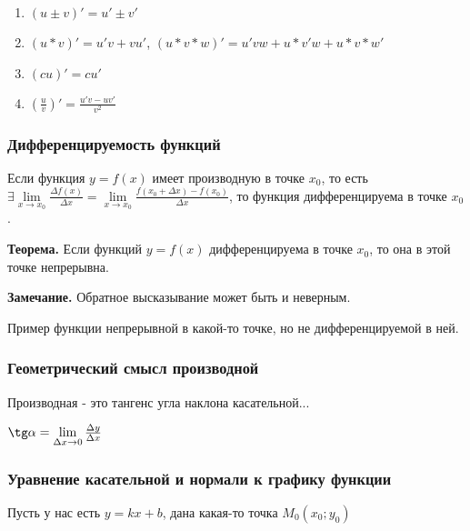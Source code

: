 \documentclass{article}
\begin{document}
\begin{flushleft}
\begin{enumerate}
    \item $(u \pm v)' = u' \pm v'$
    \item $(u * v)' = u' v + v u'$, $(u * v * w)' = u' v w + u * v' w + u * v * w'$
    \item $(cu)' = c u'$
    \item $(\frac{u}{v})' = \frac{u' v - u v'}{v^2}$
\end{enumerate}

\subsubsection{Дифференцируемость функций}

Если функция $y = f(x)$ имеет производную в точке $x_0$, то есть $\exists \lim\limits_{x \to x_0} \frac{\Delta f(x)}{\Delta x} = \lim\limits_{x \to x_0} \frac{f(x_0 + \Delta x) - f(x_0)}{\Delta x}$, то функция дифференцируема в точке $x_0$.

\hfill

\textbf{Теорема.} Если функций $y = f(x)$ дифференцируема в точке $x_0$, то она в этой точке непрерывна.

\textbf{Замечание.} Обратное высказывание может быть и неверным.

\hfill

Пример функции непрерывной в какой-то точке, но не дифференцируемой в ней.


\subsubsection{Геометрический смысл производной}

Производная - это тангенс угла наклона касательной...

$\tg \alpha = \lim\limits_{\Delta x \to 0} \frac{\Delta y}{\Delta x}$

\subsubsection{Уравнение касательной и нормали к графику функции}

Пусть у нас есть $y = kx + b$, дана какая-то точка $M_0(x_0; y_0)$


\end{flushleft}
\end{document}
